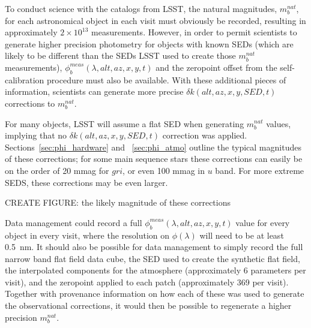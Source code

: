 \documentclass[12pt,preprint]{aastex}
\begin{document}
To conduct science with the catalogs from LSST, the natural
magnitudes, $m_b^{nat}$, for each astronomical object in each visit
must obviously be recorded, resulting in approximately
$2\times10^{13}$ measurements. However, in order to permit scientists
to generate higher precision photometry for objects with known SEDs
(which are likely to be different than the SEDs LSST used to create
those $m_b^{nat}$ measurements), $\phi_b^{meas}(\lambda,alt,az,x,y,t)$
and the zeropoint offset from the self-calibration procedure must also
be available. With these additional pieces of information, scientists
can generate more precise $\delta k(alt,az,x,y,SED,t)$ corrections to
$m_b^{nat}$.

For many objects, LSST will assume a flat SED when generating
$m_b^{nat}$ values, implying that no $\delta k(alt, az, x, y, SED, t)$
correction was applied. Sections~\ref{sec:phi_hardware} and
~\ref{sec:phi_atmo} outline the typical magnitudes of these corrections;
for some main sequence stars these corrections can easily be on the
order of 20 mmag for $gri$, or even 100 mmag in $u$ band. For more
extreme SEDS, these corrections may be even larger.

CREATE FIGURE: the likely magnitude of these corrections 

Data management could record a full
$\phi_b^{meas}(\lambda,alt,az,x,y,t)$ value for every object in every
visit, where the resolution on $\phi(\lambda)$ will need to be at
least 0.5~nm.  It should also be possible for data management to
simply record the full narrow band flat field data cube, the SED used
to create the synthetic flat field, the interpolated components for
the atmosphere (approximately 6 parameters per visit), and the
zeropoint applied to each patch (approximately 369 per
visit). Together with provenance information on how each of these was
used to generate the observational corrections, it would then be possible
to regenerate a higher precision $m_b^{nat}$.

\end{document}
